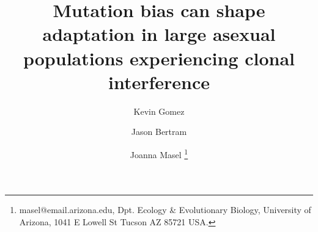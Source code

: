 \documentclass[9pt,twocolumn,twoside]{article}
\begin{document}
\title{Mutation bias can shape adaptation in large asexual populations experiencing clonal interference}
\author[$\ast$]{Kevin Gomez}
\author[$\dagger$]{Jason Bertram}
\author[,$\ddagger$]{Joanna Masel \thanks{masel@email.arizona.edu, Dpt. Ecology \& Evolutionary Biology, University of Arizona, 1041 E Lowell St Tucson AZ 85721 USA.}}


\end{document}
